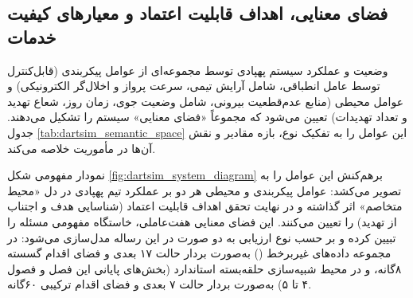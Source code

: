 \documentclass[oneside,openany,phd]{TMU-Thesis}
\begin{document}
\subsection{فضای معنایی، اهداف قابلیت اعتماد و معیارهای کیفیت خدمات}
\label{subsec:dartsim_semantic}
\label{subsec:dartsim_requirements}

وضعیت و عملکرد سیستم پهپادی توسط مجموعه‌ای از عوامل پیکربندی (قابل‌کنترل توسط عامل انطباقی، شامل آرایش تیمی، سرعت پرواز و اخلال‌گر الکترونیکی) و عوامل محیطی (منابع عدم‌قطعیت بیرونی، شامل وضعیت جوی، زمان روز، شعاع تهدید و تعداد تهدیدات) تعیین می‌شود که مجموعاً «فضای معنایی» سیستم را تشکیل می‌دهند. جدول \ref{tab:dartsim_semantic_space} این عوامل را به تفکیک نوع، بازه مقادیر و نقش آن‌ها در مأموریت خلاصه می‌کند.

\begin{table}[h!]
\centering
\caption{فضای معنایی سیستم پهپادی  (عوامل پیکربندی و محیطی)}
\label{tab:dartsim_semantic_space}
\end{table}

نمودار مفهومی شکل \ref{fig:dartsim_system_diagram} برهم‌کنش این عوامل را به تصویر می‌کشد: عوامل پیکربندی و محیطی هر دو بر عملکرد تیم پهپادی در دل «محیط متخاصم» اثر گذاشته و در نهایت تحقق اهداف قابلیت اعتماد (شناسایی هدف و اجتناب از تهدید) را تعیین می‌کنند. این فضای معنایی هفت‌عاملی، خاستگاه مفهومی مسئله را تبیین کرده و بر حسب نوع ارزیابی به دو صورت در این رساله مدل‌سازی می‌شود: در مجموعه داده‌های غیربرخط () به‌صورت بردار حالت ۱۷ بعدی و فضای اقدام گسسته ۸گانه، و در محیط شبیه‌سازی حلقه‌بسته استاندارد  (بخش‌های پایانی این فصل و فصول ۴ تا ۵) به‌صورت بردار حالت ۷ بعدی و فضای اقدام ترکیبی ۶۰گانه.
\end{document}
